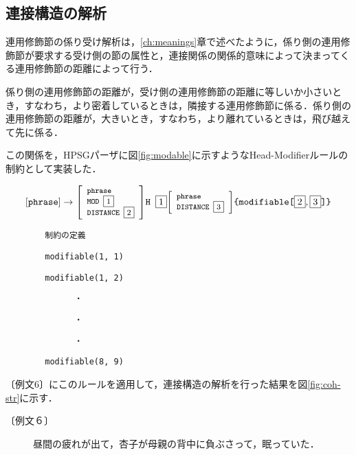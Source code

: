 \subsection{連接構造の解析}
連用修飾節の係り受け解析は，\ref{ch:meanings}章で述べたように，係り側の連用修飾節が要求する受け側の節の属性と，連接関係の関係的意味によって決まってくる連用修飾節の距離によって行う．

係り側の連用修飾節の距離が，受け側の連用修飾節の距離に等しいか小さいとき，すなわち，より密着しているときは，隣接する連用修飾節に係る．係り側の連用修飾節の距離が，大きいとき，すなわち，より離れているときは，飛び越えて先に係る．

この関係を，HPSGパーザに図\ref{fig:modable}に示すようなHead-Modifierルールの制約として実装した．

\begin{figure*}
\[
\left[
\verb|phrase|
\right]
\to
{\footnotesize
\left[
\begin{array}{l}
\verb|phrase| \\
\verb|MOD |\fbox{1} \\
\verb|DISTANCE |\fbox{2}
\end{array}
\right]
}
\verb|H |\fbox{1}
{\footnotesize
\left[
\begin{array}{l}
\verb|phrase| \\
\verb|DISTANCE |\fbox{3}
\end{array}
\right]
}
\verb|{modifiable[|\fbox{2}, \fbox{3}\verb|]}|
\]

\verb|        制約の定義|

\verb|        modifiable(1, 1)|

\verb|        modifiable(1, 2)|

\verb|              ・|

\verb|              ・|

\verb|              ・|

\verb|        modifiable(8, 9)|

\caption{Head-Modifierルールに対する連接関係の距離による連接可能性の制約}
\label{fig:modable}
\end{figure*}

〔例文6〕にこのルールを適用して，連接構造の解析を行った結果を図\ref{fig:coh-str}に示す．

\begin{description}
\item[〔例文６〕] 昼間の疲れが出て，杏子が母親の背中に負ぶさって，眠っていた．
\end{description}

